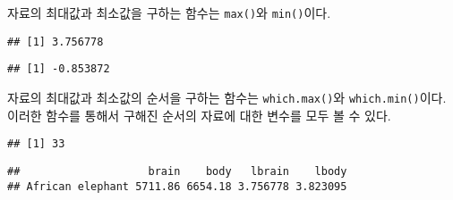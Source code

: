 \documentclass[
]{book}
\newenvironment{Shaded}{\begin{snugshade}}{\end{snugshade}}
\newcommand{\FunctionTok}[1]{\textcolor[rgb]{0.00,0.00,0.00}{#1}}
\newcommand{\NormalTok}[1]{#1}
\newcommand{\SpecialCharTok}[1]{\textcolor[rgb]{0.00,0.00,0.00}{#1}}
\begin{document}
자료의 최대값과 최소값을 구하는 함수는 \texttt{max()}와 \texttt{min()}이다.

\begin{Shaded}
\end{Shaded}

\begin{verbatim}
## [1] 3.756778
\end{verbatim}

\begin{Shaded}
\end{Shaded}

\begin{verbatim}
## [1] -0.853872
\end{verbatim}

자료의 최대값과 최소값의 순서을 구하는 함수는 \texttt{which.max()}와 \texttt{which.min()}이다.
이러한 함수를 통해서 구해진 순서의 자료에 대한 변수를 모두 볼 수 있다.

\begin{Shaded}
\end{Shaded}

\begin{verbatim}
## [1] 33
\end{verbatim}

\begin{Shaded}
\end{Shaded}

\begin{verbatim}
##                    brain    body   lbrain    lbody
## African elephant 5711.86 6654.18 3.756778 3.823095
\end{verbatim}

\begin{Shaded}
\end{Shaded}
\end{document}
